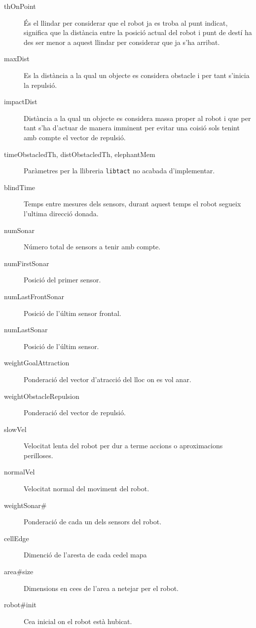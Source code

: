 \begin{description}
  \item[thOnPoint] És el llindar per considerar que el robot ja es troba al punt indicat, significa que la distància
entre la posició actual del robot i punt de destí ha des ser menor a aquest llindar per considerar que ja s'ha arribat.
  \item[maxDist] Es la distància a la qual un objecte es considera obstacle i per tant s'inicia la repulsió.
  \item[impactDist] Distància a la qual un objecte es considera massa proper al robot i que per tant s'ha
d'actuar de manera imminent per evitar una co\lgem isió sols tenint amb compte el vector de repulsió.
  \item[timeObstacledTh, distObstacledTh, elephantMem] Paràmetres per la llibreria \texttt{libtact} no acabada d'implementar.
  \item[blindTime] Temps entre mesures dels sensors, durant aquest temps el robot segueix l'ultima direcció donada.
  \item[numSonar] Número total de sensors a tenir amb compte.
  \item[numFirstSonar] Posició del primer sensor.
  \item[numLastFrontSonar] Posició de l'últim sensor frontal.
  \item[numLastSonar] Posició de l'últim sensor.
  \item[weightGoalAttraction] Ponderació del vector d'atracció del lloc on es vol anar.
  \item[weightObstacleRepulsion] Ponderació del vector de repulsió.
  \item[slowVel] Velocitat lenta del robot per dur a terme accions o aproximacions perilloses.
  \item[normalVel] Velocitat normal del moviment del robot.
  \item[weightSonar\#] Ponderació de cada un dels sensors del robot.
  \item[cellEdge] Dimenció de l'aresta de cada ce\lgem del mapa
  \item[area\#size] Dimensions en ce\lgem es de l'area a netejar per el robot.
  \item[robot\#init] Ce\lgem a inicial on el robot està hubicat.
\end{description}
